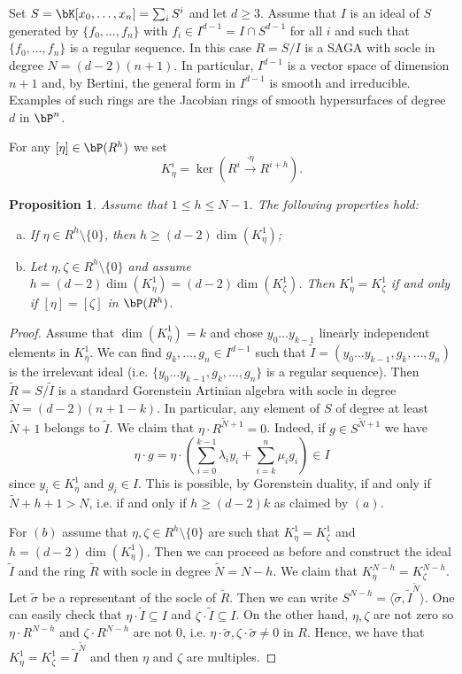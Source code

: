 \documentclass[a4paper,11pt]{amsart}
\newtheorem{proposition}[theorem]{Proposition}
\begin{document}
Set $S=\bK[x_0,\dots,x_n]=\sum_i S^i$ and let $d\geq 3$. Assume that $I$ is an ideal of $S$ generated by $\{f_0,\dots,f_n\}$ with $f_i\in I^{d-1}=I\cap S^{d-1}$ for all $i$ and such that $\{f_0,\dots,f_n\}$ is a regular sequence.  In this case $R=S/I$ is a SAGA with socle in degree $N=(d-2)(n+1)$. In particular, $I^{d-1}$ is a vector space of dimension $n+1$ and, by Bertini, the general form in $I^{d-1}$ is smooth and irreducible. Examples of such rings are the Jacobian rings of smooth hypersurfaces of degree $d$ in $\bP^n$. 

For any $[\eta]\in \bP(R^h)$ we set 
$$K^i_\eta =\ker\left(R^i\stackrel{\cdot\eta}\to R^{i+h}\right).$$
 
\begin{proposition}
\label{PROP:SameKer}
Assume that $1 \leq h\leq N-1$. The following properties hold:
\begin{enumerate}[(a)]
\item If $\eta\in R^h\setminus \{0\}$, then $h\geq(d-2)\dim(K^1_{\eta})$;
\item Let $\eta,\zeta\in R^h\setminus \{0\}$ and assume $h=(d-2)\dim(K^1_{\eta})=(d-2)\dim(K^1_{\zeta})$. Then
$K^1_\eta=K^1_\zeta$ if and only if $[\eta]=[\zeta]$ in $\bP(R^h)$.
\end{enumerate}
\end{proposition}
\begin{proof}
Assume that $\dim (K^1_\eta)=k$ and chose $y_0\dots y_{k-1}$ linearly independent elements in $K^1_{\eta}$. We can find $g_k,\dots, g_{n}\in I^{d-1}$ such that $\tilde{I}=(y_0\dots y_{k-1},g_k,\dots, g_{n})$ is the irrelevant ideal (i.e. $\{y_0\dots y_{k-1},g_k,\dots, g_{n}\}$ is a regular sequence). Then $\tilde{R}=S/\tilde{I}$ is a standard Gorenstein Artinian algebra with socle in degree
$\tilde{N}=(d-2)(n+1-k)$. In particular, any element of $S$ of degree at least $\tilde{N}+1$ belongs to $\tilde{I}$. We claim that $\eta\cdot R^{\tilde{N}+1}=0$. Indeed, if $g\in S^{\tilde{N}+1}$ we have
$$\eta\cdot g=\eta\cdot \left(\sum_{i=0}^{k-1}\lambda_iy_i+\sum_{i=k}^{n}\mu_ig_i\right)\in I$$
since $y_i\in K^1_{\eta}$ and $g_i\in I$. 
This is possible, by Gorenstein duality, if and only if $\tilde{N}+h+1>N$, i.e. if and only if $h\geq (d-2)k$ as claimed by $(a)$.

\bigskip
For $(b)$ assume that $\eta,\zeta\in R^h\setminus\{0\}$ are such that $K^{1}_\eta=K^1_{\zeta}$ and $h=(d-2)\dim(K^1_{\eta})$. Then we can proceed as before and construct the ideal $\tilde{I}$ and the ring $\tilde{R}$ with socle in degree $\tilde{N}=N-h$.
We claim that $K^{N-h}_{\eta}=K^{N-h}_{\zeta}$. Let $\tilde{\sigma}$ be a representant of the socle of $\tilde{R}$. Then we can write $S^{N-h}=\langle\tilde{\sigma},\tilde{I}^{\tilde{N}}\rangle$. One can easily check that $\eta\cdot \tilde{I}\subseteq I$ and $\zeta\cdot \tilde{I}\subseteq I$. On the other hand, $\eta,\zeta$ are not zero so $\eta\cdot R^{N-h}$ and $\zeta\cdot R^{N-h}$ are not $0$, i.e. $\eta\cdot \tilde{\sigma},\zeta\cdot \tilde{\sigma}\neq 0$ in $R$. Hence, we have that $K^1_{\eta}=K^1_{\zeta}=\tilde{I}^{\tilde{N}}$ and then $\eta$ and $\zeta$ are multiples.
\end{proof}
\end{document}
